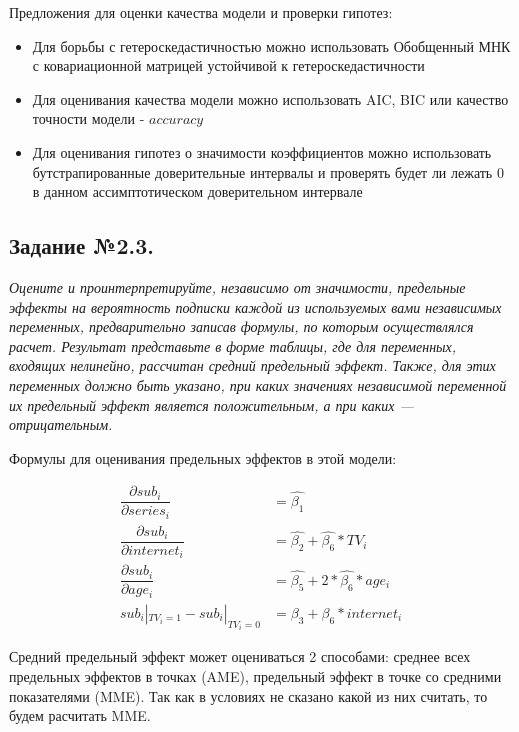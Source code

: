 \documentclass[a4paper,12pt]{article}
\begin{document}
	Предложения для оценки качества модели и проверки гипотез:
	
	\begin{itemize}
		\item  Для борьбы с гетероскедастичностью можно использовать Обобщенный МНК с ковариационной матрицей устойчивой к гетероскедастичности
		
		\item Для оценивания качества модели можно использовать AIC, BIC или качество точности модели - $accuracy$
		
		\item Для оценивания гипотез о значимости коэффициентов можно использовать бутстрапированные доверительные интервалы и проверять будет ли лежать 0 в данном ассимптотическом доверительном интервале
		
	\end{itemize}
	
	
	\subsection{Задание №2.3.}
	
	\textit{
			Оцените и проинтерпретируйте, независимо от значимости, предельные эффекты на вероятность подписки каждой из используемых вами независимых переменных, предварительно записав формулы, по которым осуществлялся расчет. Результат представьте в форме таблицы, где для переменных, входящих нелинейно, рассчитан средний предельный эффект. Также, для этих переменных должно быть указано, при каких значениях независимой переменной их предельный эффект является положительным, а при каких — отрицательным.
	}
	
	\vspace{1cm}
	
	Формулы для оценивания предельных эффектов в этой модели:
	
	\begin{align*}
		\dfrac{\partial sub_i}{\partial series_i} &= \hat{\beta_1}\\
		\dfrac{\partial sub_i}{\partial internet_i} &= \hat{\beta_2}+\hat{\beta_6}*TV_i\\
		\dfrac{\partial sub_i}{\partial age_i} &= \hat{\beta_5}+ 2*\hat{\beta_6}*age_i\\
		sub_i |_{TV_i=1} - sub_i |_{TV_i=0} &= \beta_3 + \beta_6 *internet_i
	\end{align*}
	
	Средний предельный эффект может оцениваться 2 способами: среднее всех предельных эффектов в точках (AME), предельный эффект в точке со средними показателями (MME). Так как в условиях не сказано какой из них считать, то будем расчитать MME.
	
\end{document}
